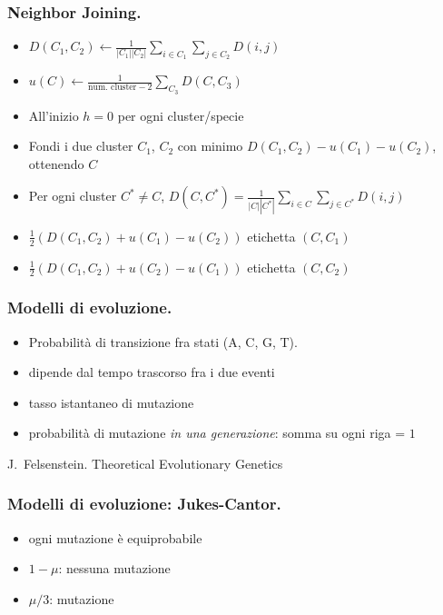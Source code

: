 \begin{frame}[fragile]
\frametitle{Neighbor Joining.}
\begin{itemize}
\item
  $D(C_{1}, C_{2}) \gets \frac{1}{|C_{1}||C_{2}|}\sum_{i\in C_{1}}\sum_{j\in C_{2}} D(i,j)$
\item
  $u(C) \gets \frac{1}{\text{num. cluster} - 2} \sum_{C_{3}} D(C,C_{3})$
\item
  All'inizio $h=0$ per ogni cluster/specie
\item
  Fondi i due cluster $C_{1}$, $C_{2}$ con minimo $D(C_{1}, C_{2}) - u(C_{1}) -u(C_{2})$, ottenendo $C$
\item
  Per ogni cluster $C^{*}\neq C$, $D(C, C^{*}) = \frac{1}{|C||C^{*}|}\sum_{i\in C}\sum_{j\in C^{*}} D(i,j)$
\item
  $\frac{1}{2}\left(D(C_{1}, C_{2}) + u(C_{1}) - u(C_{2})\right)$ etichetta $(C, C_{1})$
\item
  $\frac{1}{2}\left(D(C_{1}, C_{2}) + u(C_{2}) - u(C_{1})\right)$ etichetta $(C, C_{2})$
\end{itemize}
\end{frame}

\begin{frame}[fragile]
  \frametitle{Modelli di evoluzione.}
\begin{itemize}
\item
  Probabilità di transizione fra stati (A, C, G, T).
\item
  dipende dal tempo trascorso fra i due eventi
\item
  tasso istantaneo di mutazione
\item
  probabilità di mutazione \emph{in una generazione}: somma su ogni riga = $1$
\end{itemize}

J.~Felsenstein.
%
 Theoretical Evolutionary Genetics
\end{frame}

\begin{frame}[fragile]
  \frametitle{Modelli di evoluzione: Jukes-Cantor.}
\begin{itemize}
\item
  ogni mutazione è equiprobabile
\item
  $1-\mu$: nessuna mutazione
\item
  $\mu/3$: mutazione
\end{itemize}
\end{frame}

